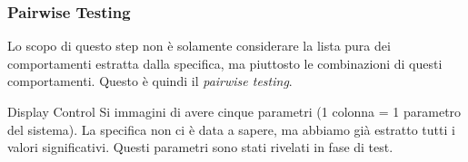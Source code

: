 \subsubsection{Pairwise Testing}

Lo scopo di questo step non è solamente considerare la lista pura dei comportamenti estratta dalla specifica, ma piuttosto le combinazioni di questi comportamenti. Questo è quindi il \textit{pairwise testing}.

\begin{example}{}{Display Control}
    Si immagini di avere cinque parametri (1 colonna = 1 parametro del sistema). La specifica non ci è data a sapere, ma abbiamo già estratto tutti i valori significativi. Questi parametri sono stati rivelati in fase di test. 
\end{example}